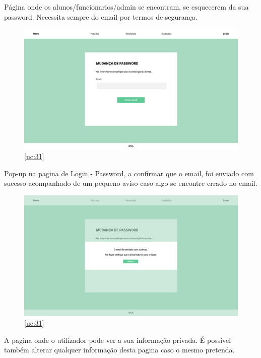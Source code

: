 \newpage 

Página onde os alunos/funcionarios/admin se encontram, se esquecerem da sua password. Necessita sempre do email por termos de segurança.

\begin{figure}[H]
	\centering
	\includegraphics[width=1\linewidth]{../Mockups/PNGs/Login - Password.png}  %
	\caption{\ref{uc:31}}
	\label{fig:chap230}
\end{figure}


\newpage

Pop-up na pagina de Login - Password, a confirmar que o email, foi enviado com sucesso acompanhado de um pequeno aviso caso algo se encontre errado no email.

\begin{figure}[H]
	\centering
	\includegraphics[width=1\linewidth]{../Mockups/PNGs/Login - Password confirmacao.png}  %
	\caption{\ref{uc:31}}
	\label{fig:chap230}
\end{figure}


\newpage 

A pagina onde o utilizador pode ver a sua informação privada. É possivel também alterar qualquer informação desta pagina caso o mesmo pretenda.

